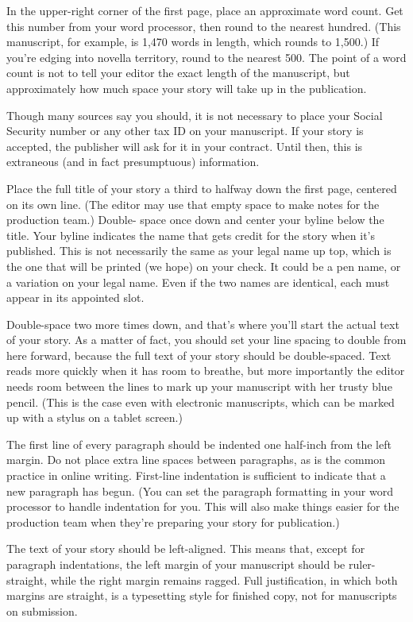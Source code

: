\documentclass[12pt]{article}
\begin{document}
In the upper-right corner of the first page, place an
approximate word count. Get this number from your word
processor, then round to the nearest hundred. (This manuscript,
for example, is 1,470 words in length, which rounds to 1,500.)
If you’re edging into novella territory, round to the nearest
500. The point of a word count is not to tell your editor the
exact length of the manuscript, but approximately how much space
your story will take up in the publication.

Though many sources say you should, it is not necessary to
place your Social Security number or any other tax ID on your
manuscript. If your story is accepted, the publisher will ask for it in your contract. Until then, this is extraneous (and in
fact presumptuous) information.

Place the full title of your story a third to halfway down
the first page, centered on its own line. (The editor may use
that empty space to make notes for the production team.) Double-
space once down and center your byline below the title. Your
byline indicates the name that gets credit for the story when
it’s published. This is not necessarily the same as your legal
name up top, which is the one that will be printed (we hope) on
your check. It could be a pen name, or a variation on your legal
name. Even if the two names are identical, each must appear in
its appointed slot.

Double-space two more times down, and that’s where you’ll
start the actual text of your story. As a matter of fact, you
should set your line spacing to double from here forward, because
the full text of your story should be double-spaced. Text reads
more quickly when it has room to breathe, but more importantly
the editor needs room between the lines to mark up your
manuscript with her trusty blue pencil. (This is the case even
with electronic manuscripts, which can be marked up with a stylus
on a tablet screen.)

The first line of every paragraph should be indented one
half-inch from the left margin. Do not place extra line spaces
between paragraphs, as is the common practice in online writing.
First-line indentation is sufficient to indicate that a new
paragraph has begun. (You can set the paragraph formatting in
your word processor to handle indentation for you. This will
also make things easier for the production team when they’re
preparing your story for publication.)

The text of your story should be left-aligned. This means
that, except for paragraph indentations, the left margin of your
manuscript should be ruler-straight, while the right margin
remains ragged. Full justification, in which both margins are
straight, is a typesetting style for finished copy, not for
manuscripts on submission.
\end{document}
